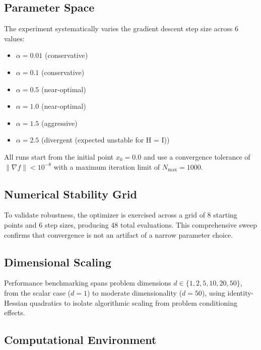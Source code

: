 \documentclass[
]{article}
\providecommand{\tightlist}{%
  \setlength{\itemsep}{0pt}\setlength{\parskip}{0pt}}
\begin{document}
\subsection{Parameter Space}\label{parameter-space}

The experiment systematically varies the gradient descent step size
across 6 values:

\begin{itemize}
\tightlist
\item
  \(\alpha = 0.01\) (conservative)
\item
  \(\alpha = 0.1\) (conservative)
\item
  \(\alpha = 0.5\) (near-optimal)
\item
  \(\alpha = 1.0\) (near-optimal)
\item
  \(\alpha = 1.5\) (aggressive)
\item
  \(\alpha = 2.5\) (divergent (expected unstable for H = I))
\end{itemize}

All runs start from the initial point \(x_0 = 0.0\) and use a
convergence tolerance of \(\|{\nabla f}\| < 10^{-8}\) with a maximum
iteration limit of \(N_{\max} = 1000\).

\subsection{Numerical Stability Grid}\label{numerical-stability-grid}

To validate robustness, the optimizer is exercised across a grid of 8
starting points and 6 step sizes, producing 48 total evaluations. This
comprehensive sweep confirms that convergence is not an artifact of a
narrow parameter choice.

\subsection{Dimensional Scaling}\label{dimensional-scaling}

Performance benchmarking spans problem dimensions
\(d \in \{1, 2, 5, 10, 20, 50\}\), from the scalar case (\(d = 1\)) to
moderate dimensionality (\(d = 50\)), using identity-Hessian quadratics
to isolate algorithmic scaling from problem conditioning effects.

\subsection{Computational Environment}\label{computational-environment}
\end{document}
